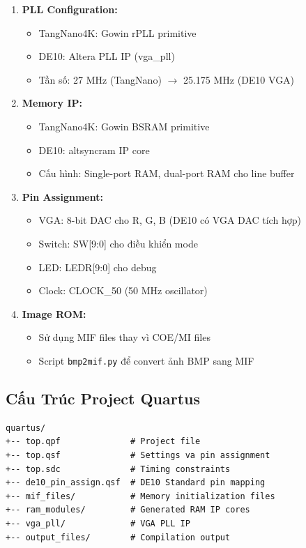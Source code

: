 \documentclass[12pt,a4paper]{article}
\begin{document}
\begin{enumerate}
    \item \textbf{PLL Configuration:}
    \begin{itemize}
        \item TangNano4K: Gowin rPLL primitive
        \item DE10: Altera PLL IP (vga\_pll)
        \item Tần số: 27 MHz (TangNano) $\rightarrow$ 25.175 MHz (DE10 VGA)
    \end{itemize}
    
    \item \textbf{Memory IP:}
    \begin{itemize}
        \item TangNano4K: Gowin BSRAM primitive
        \item DE10: altsyncram IP core
        \item Cấu hình: Single-port RAM, dual-port RAM cho line buffer
    \end{itemize}
    
    \item \textbf{Pin Assignment:}
    \begin{itemize}
        \item VGA: 8-bit DAC cho R, G, B (DE10 có VGA DAC tích hợp)
        \item Switch: SW[9:0] cho điều khiển mode
        \item LED: LEDR[9:0] cho debug
        \item Clock: CLOCK\_50 (50 MHz oscillator)
    \end{itemize}
    
    \item \textbf{Image ROM:}
    \begin{itemize}
        \item Sử dụng MIF files thay vì COE/MI files
        \item Script \texttt{bmp2mif.py} để convert ảnh BMP sang MIF
    \end{itemize}
\end{enumerate}

\subsection{Cấu Trúc Project Quartus}

\begin{verbatim}
quartus/
+-- top.qpf              # Project file
+-- top.qsf              # Settings va pin assignment
+-- top.sdc              # Timing constraints
+-- de10_pin_assign.qsf  # DE10 Standard pin mapping
+-- mif_files/           # Memory initialization files
+-- ram_modules/         # Generated RAM IP cores
+-- vga_pll/             # VGA PLL IP
+-- output_files/        # Compilation output
\end{verbatim}
\end{document}
